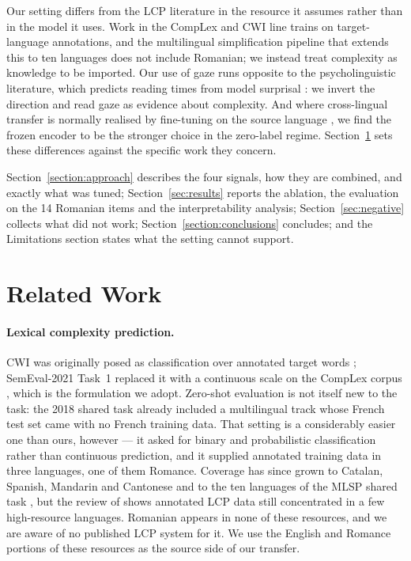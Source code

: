 \documentclass[11pt]{article}
\begin{document}
Our setting differs from the LCP literature in the resource it assumes
rather than in the model it uses. Work in the CompLex and CWI line trains
on target-language annotations, and the multilingual simplification
pipeline that extends this to ten languages
\citep{shardlow-etal-2024-bea} does not include Romanian; we instead
treat complexity as knowledge to be imported. Our use of gaze runs
opposite to the psycholinguistic literature, which predicts reading times
from model surprisal \citep{hollenstein-etal-2021-multilingual}: we
invert the direction and read gaze as evidence about complexity. And
where cross-lingual transfer is normally realised by fine-tuning on the
source language \citep{pires-etal-2019-multilingual}, we find the frozen
encoder to be the stronger choice in the zero-label regime.
Section~\ref{sec:related} sets these differences against the specific
work they concern.

Section~\ref{section:approach} describes the four signals, how they are
combined, and exactly what was tuned; Section~\ref{sec:results} reports
the ablation, the evaluation on the 14 Romanian items and the
interpretability analysis; Section~\ref{sec:negative} collects what did
not work; Section~\ref{section:conclusions} concludes; and the
Limitations section states what the setting cannot support.


\section{Related Work}
\label{sec:related}

\paragraph{Lexical complexity prediction.}
CWI was originally posed as classification over annotated target words
\citep{yimam-etal-2018-report}; SemEval-2021 Task~1 replaced it with a
continuous scale on the CompLex corpus
\citep{shardlow-etal-2021-semeval}, which is the formulation we adopt.
Zero-shot evaluation is not itself new to the task: the 2018 shared task
already included a multilingual track whose French test set came with no
French training data. That setting is a considerably easier one than
ours, however --- it asked for binary and probabilistic classification
rather than continuous prediction, and it supplied annotated training
data in three languages, one of them Romance. Coverage has since grown to
Catalan, Spanish, Mandarin and Cantonese
\citep{saggion-etal-2024-lexical, qiu-etal-2024-complex} and to the ten
languages of the MLSP shared task \citep{shardlow-etal-2024-bea}, but the
review of \citet{shardlow-etal-2024-multilingual} shows annotated LCP
data still concentrated in a few high-resource languages. Romanian
appears in none of these resources, and we are aware of no published LCP
system for it. We use the English and Romance portions of these resources
as the source side of our transfer.
\end{document}
